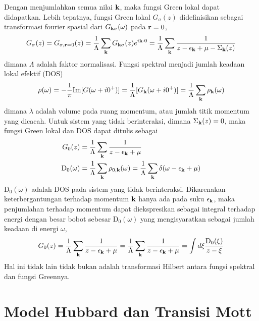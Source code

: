 Dengan menjumlahkan semua nilai $\textbf{k}$, maka fungsi Green lokal dapat didapatkan. Lebih tepatnya, fungsi Green lokal $G_\sigma(z)$ didefinisikan sebagai transformasi fourier spasial dari $G_{\textbf{k}\sigma}(\omega)$ pada $\textbf{r} = 0$,
\begin{align}
G_\sigma(z) = G_{\sigma,\textbf{r} = 0}(z) = \frac{1}{\Lambda} \sum_{\textbf{k}} G_{\textbf{k}\sigma}(z)e^{i\textbf{k}\cdot 0} = \frac{1}{\Lambda}
\sum_{\textbf{k}} \frac{1}{z - \epsilon_{\textbf{k}} + \mu - \Sigma_{\textbf{k}}(z)}
\end{align}
dimana $\Lambda$  adalah faktor normalisasi. Fungsi spektral menjadi jumlah keadaan lokal efektif (DOS)
\begin{align}
\rho(\omega) = -\frac{1}{\pi} \text{Im}[G(\omega + i0^+)] = \frac{1}{\Lambda}[G_{\textbf{k}}(\omega + i0^+)] = \frac{1}{\Lambda}\sum_{\textbf{k}} \rho_{\textbf{k}} (\omega)
\end{align}
dimana $\lambda$ adalah volume pada ruang momentum, atau jumlah titik momentum yang dicacah. Untuk sistem yang tidak berinteraksi, dimana $\Sigma_{\textbf{k}}(z) = 0$, maka fungsi Green lokal dan DOS dapat ditulis sebagai
\begin{align}
G_0(z) &= \frac{1}{\Lambda} \sum_{\textbf{k}} \frac{1}{z - \epsilon_{\textbf{k}} + \mu} \\
\text{D}_0(\omega) &= \frac{1}{\Lambda} \sum_{\textbf{k}} \rho_{0,\textbf{k}}(\omega) = \frac{1}{\Lambda} \sum_{\textbf{k}} \delta(\omega - \epsilon_{\textbf{k}} + \mu )
\end{align}
$\text{D}_0(\omega)$ adalah DOS pada sistem yang tidak berinteraksi. Dikarenakan keterbergantungan terhadap momentum $\textbf{k}$ hanya ada pada suku $\epsilon_{\textbf{k}}$, maka penjumlahan terhadap momentum dapat diekspresikan sebagai integral terhadap energi dengan besar bobot sebesar $\text{D}_0(\omega)$ yang mengisyaratkan sebagai jumlah keadaan di energi $\omega$,
\begin{align}
G_0(z) = \frac{1}{\Lambda} \sum_{\textbf{k}} \frac{1}{z - \epsilon_{\textbf{k}} + \mu}  = \frac{1}{\Lambda} \sum_{\textbf{k}} \frac{1}{z - \epsilon_{\textbf{k}} + \mu} = \int d\xi \frac{\text{D}_0(\xi)}{z - \xi}
\end{align}
Hal ini tidak lain tidak bukan adalah transformasi Hilbert antara fungsi spektral dan fungsi Greennya.

\section{Model Hubbard dan Transisi Mott}

